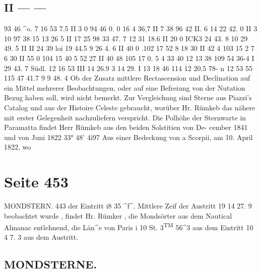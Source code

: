 \documentclass[10pt,a4paper]{article}
\begin{document}
\subsection*{II    ---    ---}

93     46     \textasciicircum{}o.  7
16     53       7.5
II      3      0
94     46       0. 0
16       4     36,7
II      7     38
96     42     II. 6
14     22     42. 0
II      3     10
97     38     15
13     26       5
II      17     25
98     33     47. 7
12     31     18.6
II     20      0
ICK3     24     43. 8
10     29     49. 5
II
II     24     39
loi     19     44.5
9     26       4. 6
II     40      0
.102     17     52
8     18     30
II     42      4
103     15       2
7       6     30
II     55       0
104     15     40
5     52     27
II     40     48
105     17       0. 5
4     33     40
12     13     38
109     54     36-4
I     29    43. 7  Südl.
12     16     53
III     14     26.9
3     14     29.  I
13     18     46
114     12     20.5
78-
n
12     53     55
115     47     41.7
9       9     48. 4
Ob  der  Zusatz  mittlere  Rectascension  und  Declination  auf  ein  Mittel  mehrerer  Beobachtungen,  oder
auf  eine  Befreiung  von  der  Nutation  Bezug  haben  soll,  wird  nicht  bemerkt.  Zur  Vergleichung  sind
Sterne  aus  Piazzi's  Catalog  und  aus  der  Histoire  Celeste  gebraucht,  worüber  Hr.  Rümkeb  das  nähere  mit
erster  Gelegenheit  nachzuliefern  verspricht.
Die  Polhöhe  der  Sternwarte  in  Paramatta  findet  Herr  Rümkeb  aus  den  beiden  Solstitien  von  De-
cember  1841  und  von  Juni  1822
33°  48'   4i\glqq{}97
Aus  einer  Bedeckung  von  a  Scorpii,  am  10.  April  1822,  wo

\newpage
\section*{Seite 453}

MONDSTERN.  443
der  Eintritt
i8\glqq{}  35\glqq{}  \textasciicircum{}f\textasciicircum{}.  Mittlere  Zeif
der  Austritt
19     14     27. 9
beobachtet  wurde ,  findet  Hr.  Rümker  ,  die  Mondsörter  aus  dem  Nautical  Almanac  entlehnend,  die  Län\textasciicircum{}e
von  Paris
i         10  St.  3\textsuperscript{TM}  56\textasciicircum{}3  aus  dem  Eintritt
10         4      7. 3  aus  dem  Austritt.
\subsection*{MONDSTERNE.}
\end{document}
